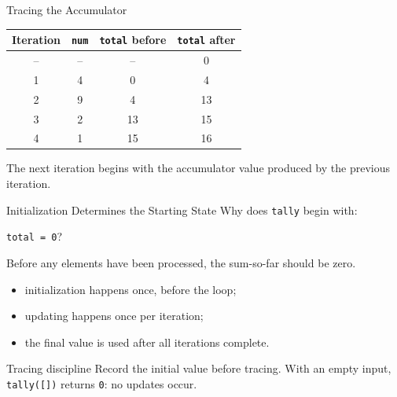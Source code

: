 \documentclass[aspectratio=169,10pt]{beamer}
\begin{document}
\begin{frame}{Tracing the Accumulator}
  \begin{center}
    \renewcommand{\arraystretch}{1.35}
    \begin{tabular}{c|c|c|c}
      \textbf{Iteration} & \textbf{\texttt{num}} & \textbf{\texttt{total} before} & \textbf{\texttt{total} after} \\\hline
      -- & -- & -- & 0 \\
      1 & 4 & 0 & 4 \\
      2 & 9 & 4 & 13 \\
      3 & 2 & 13 & 15 \\
      4 & 1 & 15 & 16
    \end{tabular}
  \end{center}

  \begin{keyidea}
    The next iteration begins with the accumulator value produced by the previous iteration.
  \end{keyidea}
\end{frame}

\begin{frame}{Initialization Determines the Starting State}
  Why does \texttt{tally} begin with:
  \begin{center}
    \texttt{total = 0}?
  \end{center}

  Before any elements have been processed, the sum-so-far should be zero.

  \begin{itemize}
    \item initialization happens once, before the loop;
    \item updating happens once per iteration;
    \item the final value is used after all iterations complete.
  \end{itemize}

  \begin{alertblock}{Tracing discipline}
    Record the initial value before tracing. With an empty input, \texttt{tally([])} returns \texttt{0}: no updates occur.
  \end{alertblock}
\end{frame}
\end{document}
